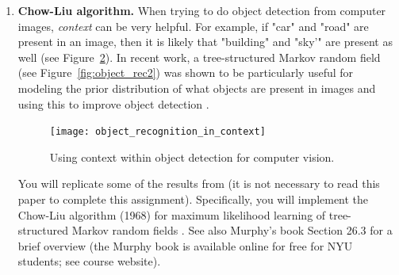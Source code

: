 \documentclass{article}
\begin{document}
\begin{enumerate}
\begin{enumerate}
\pagebreak
\item Repeat the previous part with a higher error probability of $\epsilon =0.10$, and discuss differences.
\\
\noindent\rule{14cm}{2pt}
\\
\\
\textbf{Solutions:}
\\
The results is shown in Figure \ref{fig:p3-ptf}. With a higher error rate, the model have only limited ability to decode and cannot fully restore the original image within 30 iterations.
\begin{figure}
\texttt{[image: p3-ptf.png]}
\centering
\caption{Repeat part e with error rate 0.10.}
\label{fig:p3-ptf}
\end{figure}
\pagebreak


\end{enumerate}

\pagebreak

\item {\bf Chow-Liu algorithm.} When trying to do object detection from computer images, {\em context} can be very helpful. For example, if "car" and "road" are present in an image, then it is likely that "building" and "sky'" are present as well (see Figure~\ref{fig:object_rec}). In recent work, a tree-structured Markov random field (see Figure~\ref{fig:object_rec2}) was shown to be particularly useful for modeling the prior distribution of what objects are present in images and using this to improve object detection \cite{choi_cvpr10}.
\begin{figure}[t]
\centering
\texttt{[image: object\_recognition\_in\_context]}
\vspace{-8mm}
\caption{Using context within object detection for computer vision. \cite{choi_cvpr10}
\label{fig:object_rec}}
\end{figure}

You will replicate some of the results from
\cite{choi_cvpr10} (it is not necessary to read this paper to complete
this assignment).
Specifically, you will implement the Chow-Liu
  algorithm (1968) for maximum likelihood learning of tree-structured
  Markov random fields \cite{Chow68approximatingdiscrete}. See also
  Murphy's book Section 26.3 for a brief overview (the
  Murphy book is available online for free for NYU students; see course website).


\end{enumerate}
\end{document}
